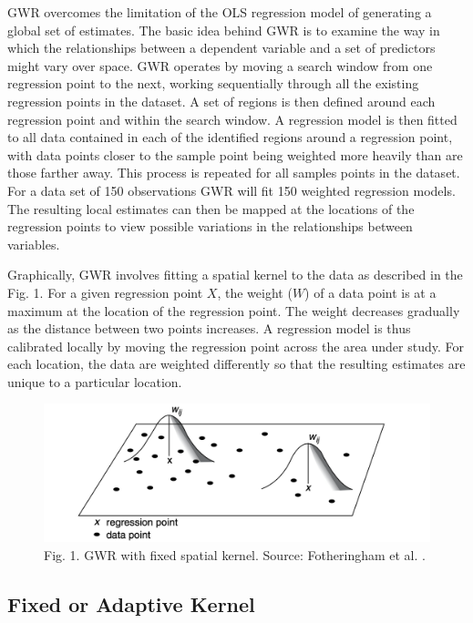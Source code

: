 \documentclass[
]{book}
\begin{document}
GWR overcomes the limitation of the OLS regression model of generating a global set of estimates. The basic idea behind GWR is to examine the way in which the relationships between a dependent variable and a set of predictors might vary over space. GWR operates by moving a search window from one regression point to the next, working sequentially through all the existing regression points in the dataset. A set of regions is then defined around each regression point and within the search window. A regression model is then fitted to all data contained in each of the identified regions around a regression point, with data points closer to the sample point being weighted more heavily than are those farther away. This process is repeated for all samples points in the dataset. For a data set of 150 observations GWR will fit 150 weighted regression models. The resulting local estimates can then be mapped at the locations of the regression points to view possible variations in the relationships between variables.

Graphically, GWR involves fitting a spatial kernel to the data as described in the Fig. 1. For a given regression point \(X\), the weight (\(W\)) of a data point is at a maximum at the location of the regression point. The weight decreases gradually as the distance between two points increases. A regression model is thus calibrated locally by moving the regression point across the area under study. For each location, the data are weighted differently so that the resulting estimates are unique to a particular location.

\begin{figure}
\centering
\includegraphics{figs/ch8/fixed_bandwidth.png}
\caption{Fig. 1. GWR with fixed spatial kernel. Source: Fotheringham et al. \citeyearpar[p.45]{Fotheringham_et_al_2002_book}.}
\end{figure}

\hypertarget{fixed-or-adaptive-kernel}{%
\subsection{Fixed or Adaptive Kernel}\label{fixed-or-adaptive-kernel}}
\end{document}
